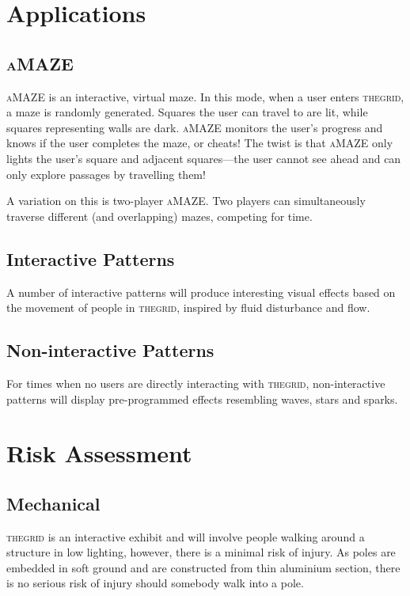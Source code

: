 \documentclass[12pt]{article} %
\newcommand{\thegrid}{\textsc{the\textperiodcentered grid}\xspace}
\newcommand{\amaze}{\textsc{aMAZE}\xspace}
\begin{document}
\section{Applications}
\subsection{\amaze}
\amaze is an interactive, virtual maze.  In this mode, when a user enters
\thegrid, a maze is randomly generated.  Squares the user can travel to are
lit, while squares representing walls are dark.  \amaze monitors the user's
progress and knows if the user completes the maze, or cheats!  The twist is
that \amaze only lights the user's square and adjacent squares---the user
cannot see ahead and can only explore passages by travelling them!

A variation on this is two-player \amaze.  Two players can simultaneously
traverse different (and overlapping) mazes, competing for time.

\subsection{Interactive Patterns}
A number of interactive patterns will produce interesting visual effects based
on the movement of people in \thegrid, inspired by fluid disturbance and flow.

\subsection{Non-interactive Patterns}
For times when no users are directly interacting with \thegrid, non-interactive
patterns will display pre-programmed effects resembling waves, stars and
sparks.

\clearpage
\section{Risk Assessment}
\subsection{Mechanical}
\thegrid is an interactive exhibit and will involve people walking around a
structure in low lighting, however, there is a minimal risk of injury.  As
poles are embedded in soft ground and are constructed from thin aluminium
section, there is no serious risk of injury should somebody walk into a pole.
\end{document}
